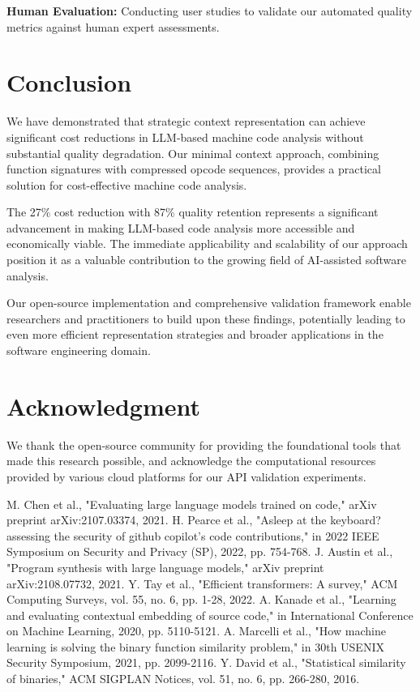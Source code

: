 \documentclass[conference]{IEEEtran}
\begin{document}
\textbf{Human Evaluation:} Conducting user studies to validate our automated quality metrics against human expert assessments.

\section{Conclusion}

We have demonstrated that strategic context representation can achieve significant cost reductions in LLM-based machine code analysis without substantial quality degradation. Our minimal context approach, combining function signatures with compressed opcode sequences, provides a practical solution for cost-effective machine code analysis.

The 27\% cost reduction with 87\% quality retention represents a significant advancement in making LLM-based code analysis more accessible and economically viable. The immediate applicability and scalability of our approach position it as a valuable contribution to the growing field of AI-assisted software analysis.

Our open-source implementation and comprehensive validation framework enable researchers and practitioners to build upon these findings, potentially leading to even more efficient representation strategies and broader applications in the software engineering domain.

\section*{Acknowledgment}

We thank the open-source community for providing the foundational tools that made this research possible, and acknowledge the computational resources provided by various cloud platforms for our API validation experiments.

\begin{thebibliography}{00}
 M. Chen et al., "Evaluating large language models trained on code," arXiv preprint arXiv:2107.03374, 2021.
 H. Pearce et al., "Asleep at the keyboard? assessing the security of github copilot's code contributions," in 2022 IEEE Symposium on Security and Privacy (SP), 2022, pp. 754-768.
 J. Austin et al., "Program synthesis with large language models," arXiv preprint arXiv:2108.07732, 2021.
 Y. Tay et al., "Efficient transformers: A survey," ACM Computing Surveys, vol. 55, no. 6, pp. 1-28, 2022.
 A. Kanade et al., "Learning and evaluating contextual embedding of source code," in International Conference on Machine Learning, 2020, pp. 5110-5121.
 A. Marcelli et al., "How machine learning is solving the binary function similarity problem," in 30th USENIX Security Symposium, 2021, pp. 2099-2116.
 Y. David et al., "Statistical similarity of binaries," ACM SIGPLAN Notices, vol. 51, no. 6, pp. 266-280, 2016.
\end{thebibliography}
\end{document}
